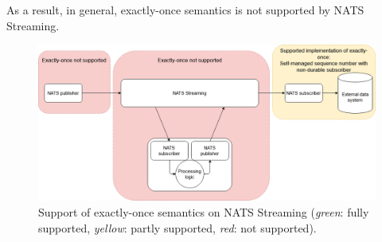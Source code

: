 As a result, in general, exactly-once semantics is not supported by NATS Streaming.


\begin{figure}[h]
	\centering
	\includegraphics[width=\linewidth]{images/exactly-once-nats.png}
	\caption{Support of exactly-once semantics on NATS Streaming (\emph{green}: fully supported, \emph{yellow}: partly supported, \emph{red}: not supported).}
	\label{fig:exactlyoncenats}
\end{figure}






